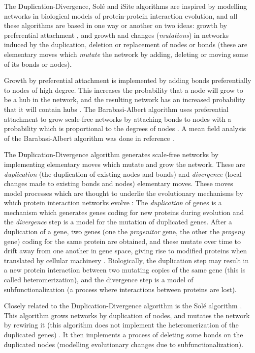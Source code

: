 \documentclass[12pt]{iopart}
\begin{document}
The Duplication-Divergence, Sol\'e and iSite algorithms are inspired by modelling
networks in biological models of protein-protein interaction evolution, and all these
algorithms are based in one way or another on two ideas: growth by 
preferential attachment \cite{EL03}, and growth and changes (\textit{mutations})
in networks induced by the duplication, deletion or replacement of nodes or bonds (these
are elementary moves which \textit{mutate} the network by adding, deleting 
or moving some of its bonds or nodes). 

Growth by preferential attachment is implemented by adding bonds preferentially to
nodes of high degree.  This increases the probability that a node will grow to be
a hub in the network, and the resulting network has an increased probability that
it will contain hubs \cite{BA99}.  The Barabasi-Albert algorithm uses preferential
attachment to grow scale-free networks by attaching bonds to nodes with a probability
which is proportional to the degrees of nodes \cite{AB02}.  A mean field analysis
of the Barabasi-Albert algorithm was done in reference \cite{BAJ99}.

The Duplication-Divergence algorithm \cite{VF02,TR04} generates scale-free networks
by implementing elementary moves which mutate and grow the network.  These
are \textit{duplication} (the duplication of existing nodes and bonds) and \textit{divergence}
(local changes made to existing bonds and nodes) elementary moves.  These moves model 
processes which are thought to underlie the evolutionary mechanisms by which protein
interaction networks evolve \cite{VF02,PS03,TR04}:  The \textit{duplication} of genes 
is a mechanism which generates genes coding for new proteins during evolution
and the \textit{divergence} step is a model for the mutation of duplicated genes. 
After a duplication of a gene, two genes (one the \textit{progenitor} gene, the other the
\textit{progeny} gene) coding for the same protein are obtained, and these
mutate over time to drift away from one another in gene space, giving rise to modified
proteins when translated by cellular machinery \cite{PS03}.  Biologically, the
duplication step may result in a new protein interaction between two mutating copies
of the same gene (this is called heteromerization), and the divergence
step is a model of subfunctionalization (a process where interactions between
proteins are lost).

Closely related to the Duplication-Divergence algorithm is the Sol\'e algorithm 
\cite{SPSK02,PS03}.  This algorithm grows networks by duplication of nodes, and 
mutates the network by rewiring it (this algorithm does not implement the heteromerization
of the duplicated genes)  \cite{BAJ00}.  It then implements a process of deleting some bonds
on the duplicated nodes (modelling evolutionary changes due to subfunctionalization).  
\end{document}

